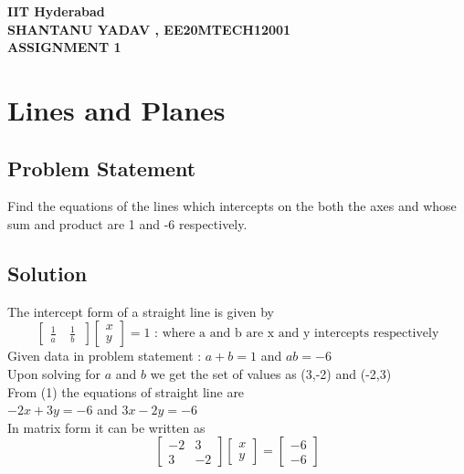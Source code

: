 \documentclass[12pt]{article}
\begin{document}
\begin{center}
	{\Large \bf IIT Hyderabad} \\ \vspace{2ex}
	{\large \bf SHANTANU YADAV , EE20MTECH12001 }\\
	\vspace{2ex}
	{\large \bf ASSIGNMENT 1} \\
\end{center}
\vspace{1ex}
\section*{Lines and Planes}
\subsection*{Problem Statement}
Find the equations of the lines which intercepts on the both the axes and whose sum and product are 1 and -6 respectively.
\subsection*{Solution}
The intercept form of a straight line is given by 
\begin{equation}
\begin{bmatrix}
 \frac{1}{a}\ & \frac{1}{b}\
\end{bmatrix}
\begin{bmatrix}
 x \\
 y
\end{bmatrix}
= 1           \text{        :  where a and b are x and y intercepts respectively}       
\end{equation}
Given data in problem statement : $ a + b =1 $ and $ ab = -6$ \\       
Upon solving for $a$ and $b$ we get the set of values as (3,-2) and (-2,3)\\
From (1) the equations of straight line are \\
$-2x + 3y = -6$ and $ 3x - 2y = -6$\\
In matrix form it can be written as 
\begin{equation}
\begin{bmatrix}
	 -2 &  3 \\
	  3 & -2
\end{bmatrix}
\begin{bmatrix}
	x \\
	y
\end{bmatrix}
=
	\begin{bmatrix}
		-6 \\
		-6
	\end{bmatrix}
\end{equation}
\end{document}
